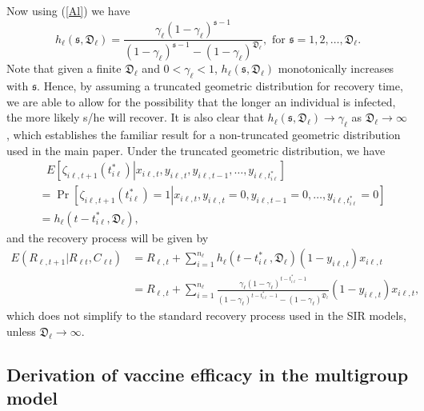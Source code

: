 \documentclass[12pt]{article}
\begin{document}
Now using (\ref{Al}) we have
\[
h_{\ell}\left(  \mathfrak{s},\mathfrak{D}_{\ell}\right)  =\frac{\gamma_{\ell
}\left(  1-\gamma_{\ell}\right)  ^{\mathfrak{s}-1}}{\left(  1-\gamma_{\ell
}\right)  ^{\mathfrak{s}-1}-\left(  1-\gamma_{\ell}\right)  ^{\mathfrak{D}%
_{\ell}}},\text{ for }\mathfrak{s}=1,2,\ldots,\mathfrak{D}_{\ell}\mathfrak{.}%
\]
Note that given a finite $\mathfrak{D}_{\ell}$ and $0<\gamma_{\ell}<1$,
$h_{\ell}\left(  \mathfrak{s},\mathfrak{D}_{\ell}\right)  $ monotonically
increases with $\mathfrak{s}$. Hence, by assuming a truncated geometric
distribution for recovery time, we are able to allow for the possibility that
the longer an individual is infected, the more likely s/he will recover. It is
also clear that $h_{\ell}\left(  \mathfrak{s},\mathfrak{D}_{\ell}\right)
\rightarrow\gamma_{\ell}$ as $\mathfrak{D}_{\ell}\rightarrow\infty$, which
establishes the familiar result for a non-truncated geometric distribution
used in the main paper. Under the truncated geometric distribution, we have%
\begin{align*}
&  \text{ \ \ }E\left[  \zeta_{i\ell,t+1}\left(  t_{i\ell}^{\ast}\right)
\left\vert x_{i\ell,t},y_{i\ell,t},y_{i\ell,t-1},\ldots,y_{i\ell,t_{i\ell
}^{\ast}}\right.  \right] \\
&  =\Pr\left[  \zeta_{i\ell,t+1}\left(  t_{i\ell}^{\ast}\right)  =1\left\vert
x_{i\ell,t},y_{i\ell,t}=0,y_{i\ell,t-1}=0,\ldots,y_{i\ell,t_{i\ell}^{\ast}%
}=0\right.  \right] \\
&  =h_{\ell}\left(  t-t_{i\ell}^{\ast},\mathfrak{D}_{\ell}\right)  ,
\end{align*}
and the recovery process will be given by
\begin{align}
E\left(  R_{\ell,t+1}|R_{\ell t},C_{\ell t}\right)   &  =R_{\ell,t}+\sum
_{i=1}^{n_{\ell}}h_{\ell}\left(  t-t_{i\ell}^{\ast},\mathfrak{D}_{\ell
}\right)  \left(  1-y_{i\ell,t}\right)  x_{i\ell,t}\nonumber\\
&  =R_{\ell,t}+\sum_{i=1}^{n_{\ell}}\frac{\gamma_{\ell}\left(  1-\gamma_{\ell
}\right)  ^{t-t_{i\ell}^{\ast}-1}}{\left(  1-\gamma_{\ell}\right)
^{t-t_{i\ell}^{\ast}-1}-\left(  1-\gamma_{\ell}\right)  ^{\mathfrak{D}_{\ell}%
}}\left(  1-y_{i\ell,t}\right)  x_{i\ell,t}, \label{GenRec}%
\end{align}
which does not simplify to the standard recovery process used in the SIR
models, unless $\mathfrak{D}_{\ell}\rightarrow\infty$.

\subsection{Derivation of vaccine efficacy in the multigroup
model\label{Sup: VE}}
\end{document}
